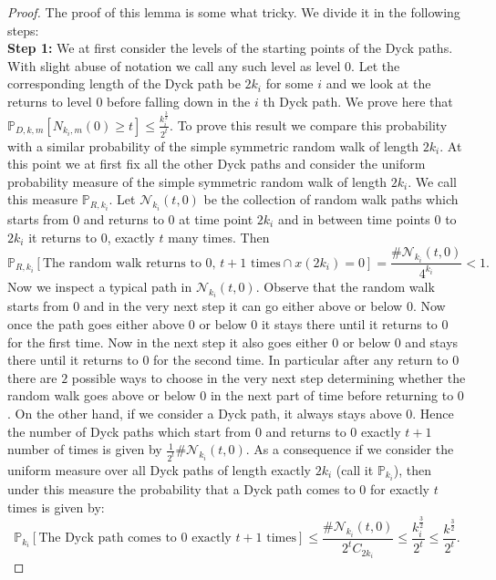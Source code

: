 \documentclass[12pt]{article}
\numberwithin{equation}{section}
\numberwithin{equation}{section}
\theoremstyle{definition}
\renewcommand{\1}{\bf 1}
\begin{document}
\begin{proof}
The proof of this lemma is some what tricky. We divide it in the following steps:\\
\textbf{Step 1:} We at first consider the levels of the starting points of the Dyck paths. With slight abuse of notation we call any such level as level $0$. Let the corresponding length of the Dyck path be $2k_{i}$ for some $i$ and we look at the returns to level $0$ before falling down in the $i$ th Dyck path. We prove here that $\mathbb{P}_{D,k,m}\left[ N_{k_{i},m}(0) \ge t \right]\le \frac{k_{i}^{\frac{3}{2}}}{2^{t}}$. To prove this result we compare this probability with a similar probability of the simple symmetric random walk of length $2k_{i}$. At this point we at first fix all the other Dyck paths and consider the uniform probability measure of the simple symmetric random walk of length $2k_{i}$. We call this measure $\mathbb{P}_{R,k_{i}}.$ Let $\mathcal{N}_{k_{i}}(t,0)$ be the collection of random walk paths which starts from $0$ and returns to $0$ at time point $2k_{i}$ and in between time points $0$ to $2k_{i}$ it returns to $0$, exactly $t$ many times. Then 
\begin{equation}
\mathbb{P}_{R,k_{i}}\left[ \text{The random walk returns to $0$, $t+1$ times} \cap x(2k_{i})=0 \right]=\frac{\#\mathcal{N}_{k_{i}}(t,0)}{4^{k_{i}}}<1.
\end{equation} 
Now we inspect a typical path in $\mathcal{N}_{k_{i}}(t,0)$. Observe that the random walk starts from $0$ and in the very next step it can go either above or below $0$. Now once the path goes either above $0$ or below $0$ it stays there until it returns to $0$ for the first time. Now in the next step it also goes either $0$ or below $0$ and stays there until it returns to $0$ for the second time. In particular after any return to $0$ there are $2$ possible ways to choose in the very next step determining whether the random walk goes above or below $0$ in the next part of time before returning to $0$. On the other hand, if we consider a Dyck path, it always stays above $0$. Hence the number of Dyck paths which start from $0$ and returns to $0$ exactly $t+1$ number of times is given by $\frac{1}{2^{t}}\#\mathcal{N}_{k_{i}}(t,0)$. As a consequence if we consider the uniform measure over all Dyck paths of length  exactly $2k_{i}$ (call it $\mathbb{P}_{k_{i}}$), then under this measure the probability that a Dyck path comes to $0$ for exactly $t$ times is given by:
\begin{equation}
\mathbb{P}_{k_{i}}\left[ \text{The Dyck path comes to $0$ exactly $t+1$ times} \right]\le \frac{\#\mathcal{N}_{k_{i}}(t,0)}{2^{t}C_{2k_{i}}}\le \frac{k_{i}^{\frac{3}{2}}}{2^{t}}\le \frac{k^{\frac{3}{2}}}{2^{t}}. 

\end{equation}
\end{proof}
\end{document}
